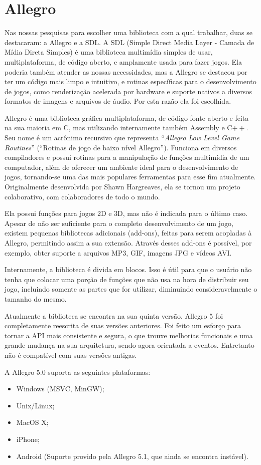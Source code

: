 \documentclass[a4paper,12pt]{report}
\begin{document}
\section{Allegro}
\label{allegro}
%
Nas nossas pesquisas para escolher uma biblioteca com a qual trabalhar, duas se destacaram: a Allegro e a SDL. A SDL (Simple Direct Media Layer - 
Camada de Mídia Direta Simples) é uma biblioteca multimídia simples de usar, multiplataforma, de código aberto, e amplamente usada para fazer  jogos. 
Ela poderia também atender as nossas necessidades, mas a Allegro se destacou por ter um código mais limpo e intuitivo, e rotinas específicas 
para o desenvolvimento de jogos, como renderização acelerada por hardware e suporte nativos a diversos formatos de imagens e arquivos de áudio.
Por esta razão ela foi escolhida.
\par 
Allegro é uma biblioteca gráfica multiplataforma, de código fonte aberto e feita na sua maioria em C, mas utilizando internamente também Assembly e C$++$. 
Seu nome é um acrônimo recursivo que representa ``\textit{Allegro Low Level Game Routines}'' (``Rotinas de jogo de baixo nível Allegro'').
Funciona em diversos compiladores e possui rotinas para a manipulação de funções multimídia de um computador, além de oferecer um ambiente ideal 
para o desenvolvimento de jogos, tornando-se uma das mais populares ferramentas para esse fim atualmente. Originalmente desenvolvida por 
Shawn Hargreaves, ela se tornou um projeto colaborativo, com colaboradores de todo o mundo.
\par
Ela possui funções para jogos 2D e 3D, mas não é indicada para o último caso. Apesar de não ser suficiente para o completo desenvolvimento 
de um jogo, existem pequenas bibliotecas adicionais (add-ons), feitas para serem acopladas à Allegro, permitindo assim a sua extensão. Através 
desses add-ons é possível, por exemplo, obter suporte a arquivos MP3, GIF, imagens JPG e vídeos AVI.
\par
Internamente, a biblioteca é divida em blocos. Isso é útil para que o usuário não tenha que colocar uma porção de funções que não usa na hora 
de distribuir seu jogo, incluindo somente as partes que for utilizar, diminuindo consideravelmente o tamanho do mesmo.
\par
Atualmente a biblioteca se encontra na sua quinta versão. Allegro 5 foi completamente reescrita de suas versões anteriores. Foi feito um esforço 
para tornar a API mais consistente e segura, o que trouxe melhorias funcionais e uma grande mudança na sua arquitetura, sendo agora orientada 
a eventos. Entretanto não é compatível com suas versões antigas.
\par
A Allegro 5.0 suporta as seguintes plataformas:
\begin{itemize}
 \item Windows (MSVC, MinGW);
 \item Unix/Linux;
 \item MacOS X;
 \item iPhone;
 \item Android (Suporte provido pela Allegro 5.1, que ainda se encontra instável).
\end{itemize}
%
%
\end{document}

